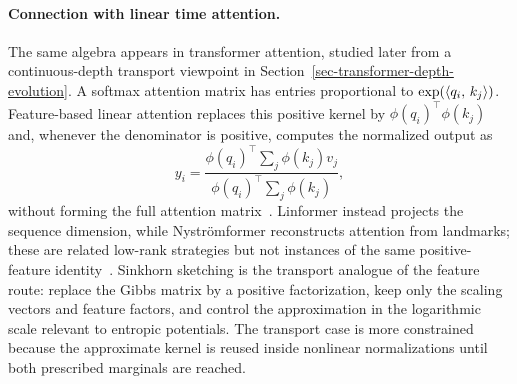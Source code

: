 \paragraph{Connection with linear time attention.}
The same algebra appears in transformer attention, studied later from a continuous-depth transport viewpoint in Section~\ref{sec-transformer-depth-evolution}. A softmax attention matrix has entries proportional to \(\exp(\langle q_i,\,k_j\rangle)\). Feature-based linear attention replaces this positive kernel by \(\phi(q_i)^\top\phi(k_j)\) and, whenever the denominator is positive, computes the normalized output as
\[
	y_i
	=
	\frac{\phi(q_i)^\top\sum_j\phi(k_j)v_j}
	{\phi(q_i)^\top\sum_j\phi(k_j)},
\]
without forming the full attention matrix~\cite{Katharopoulos2020LinearAttention,Choromanski2021Performer}. Linformer instead projects the sequence dimension, while Nystr\"omformer reconstructs attention from landmarks; these are related low-rank strategies but not instances of the same positive-feature identity~\cite{Wang2020Linformer,Xiong2021Nystromformer}. Sinkhorn sketching is the transport analogue of the feature route: replace the Gibbs matrix by a positive factorization, keep only the scaling vectors and feature factors, and control the approximation in the logarithmic scale relevant to entropic potentials. The transport case is more constrained because the approximate kernel is reused inside nonlinear normalizations until both prescribed marginals are reached.
